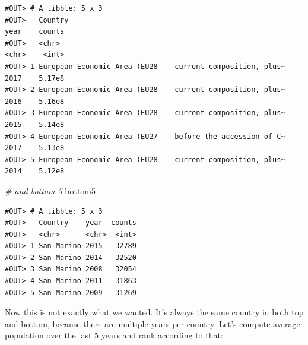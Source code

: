 \documentclass[]{book}
\newenvironment{Shaded}{\begin{snugshade}}{\end{snugshade}}
\newcommand{\CommentTok}[1]{\textcolor[rgb]{0.56,0.35,0.01}{\textit{#1}}}
\newcommand{\DataTypeTok}[1]{\textcolor[rgb]{0.13,0.29,0.53}{#1}}
\newcommand{\DecValTok}[1]{\textcolor[rgb]{0.00,0.00,0.81}{#1}}
\newcommand{\KeywordTok}[1]{\textcolor[rgb]{0.13,0.29,0.53}{\textbf{#1}}}
\newcommand{\NormalTok}[1]{#1}
\newcommand{\OperatorTok}[1]{\textcolor[rgb]{0.81,0.36,0.00}{\textbf{#1}}}
\newcommand{\StringTok}[1]{\textcolor[rgb]{0.31,0.60,0.02}{#1}}
\begin{document}
\begin{verbatim}
#OUT> # A tibble: 5 x 3
#OUT>   Country                                                    year    counts
#OUT>   <chr>                                                      <chr>    <int>
#OUT> 1 European Economic Area (EU28  - current composition, plus~ 2017    5.17e8
#OUT> 2 European Economic Area (EU28  - current composition, plus~ 2016    5.16e8
#OUT> 3 European Economic Area (EU28  - current composition, plus~ 2015    5.14e8
#OUT> 4 European Economic Area (EU27 -  before the accession of C~ 2017    5.13e8
#OUT> 5 European Economic Area (EU28  - current composition, plus~ 2014    5.12e8
\end{verbatim}

\begin{Shaded}
\begin{Highlighting}[]
\CommentTok{# and bottom 5}
\NormalTok{bottom5}
\end{Highlighting}
\end{Shaded}

\begin{verbatim}
#OUT> # A tibble: 5 x 3
#OUT>   Country    year  counts
#OUT>   <chr>      <chr>  <int>
#OUT> 1 San Marino 2015   32789
#OUT> 2 San Marino 2014   32520
#OUT> 3 San Marino 2008   32054
#OUT> 4 San Marino 2011   31863
#OUT> 5 San Marino 2009   31269
\end{verbatim}

Now this is not exactly what we wanted. It's always the same country in both top and bottom, because there are multiple years per country. Let's compute average population over the last 5 years and rank according to that:

\begin{Shaded}
\end{Shaded}
\end{document}
